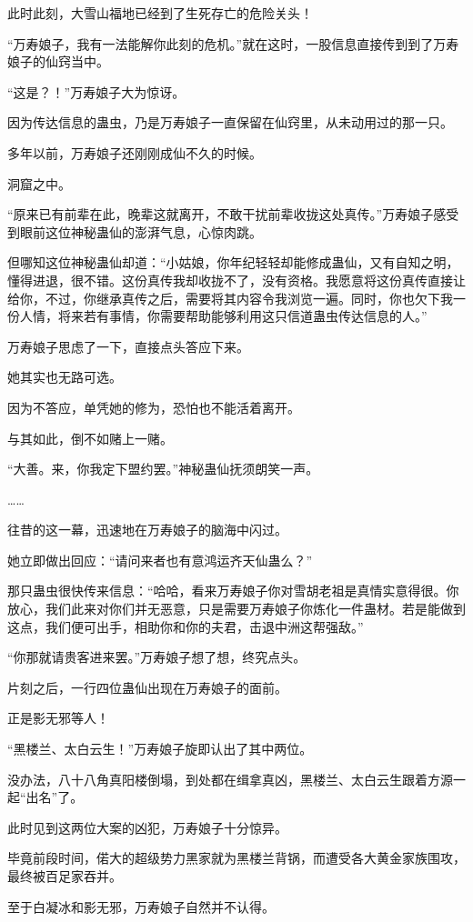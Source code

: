 \begin{this_body}
此时此刻，大雪山福地已经到了生死存亡的危险关头！

“万寿娘子，我有一法能解你此刻的危机。”就在这时，一股信息直接传到到了万寿娘子的仙窍当中。

“这是？！”万寿娘子大为惊讶。

因为传达信息的蛊虫，乃是万寿娘子一直保留在仙窍里，从未动用过的那一只。

多年以前，万寿娘子还刚刚成仙不久的时候。

洞窟之中。

“原来已有前辈在此，晚辈这就离开，不敢干扰前辈收拢这处真传。”万寿娘子感受到眼前这位神秘蛊仙的澎湃气息，心惊肉跳。

但哪知这位神秘蛊仙却道：“小姑娘，你年纪轻轻却能修成蛊仙，又有自知之明，懂得进退，很不错。这份真传我却收拢不了，没有资格。我愿意将这份真传直接让给你，不过，你继承真传之后，需要将其内容令我浏览一遍。同时，你也欠下我一份人情，将来若有事情，你需要帮助能够利用这只信道蛊虫传达信息的人。”

万寿娘子思虑了一下，直接点头答应下来。

她其实也无路可选。

因为不答应，单凭她的修为，恐怕也不能活着离开。

与其如此，倒不如赌上一赌。

“大善。来，你我定下盟约罢。”神秘蛊仙抚须朗笑一声。

……

往昔的这一幕，迅速地在万寿娘子的脑海中闪过。

她立即做出回应：“请问来者也有意鸿运齐天仙蛊么？”

那只蛊虫很快传来信息：“哈哈，看来万寿娘子你对雪胡老祖是真情实意得很。你放心，我们此来对你们并无恶意，只是需要万寿娘子你炼化一件蛊材。若是能做到这点，我们便可出手，相助你和你的夫君，击退中洲这帮强敌。”

“你那就请贵客进来罢。”万寿娘子想了想，终究点头。

片刻之后，一行四位蛊仙出现在万寿娘子的面前。

正是影无邪等人！

“黑楼兰、太白云生！”万寿娘子旋即认出了其中两位。

没办法，八十八角真阳楼倒塌，到处都在缉拿真凶，黑楼兰、太白云生跟着方源一起“出名”了。

此时见到这两位大案的凶犯，万寿娘子十分惊异。

毕竟前段时间，偌大的超级势力黑家就为黑楼兰背锅，而遭受各大黄金家族围攻，最终被百足家吞并。

至于白凝冰和影无邪，万寿娘子自然并不认得。


\end{this_body}
